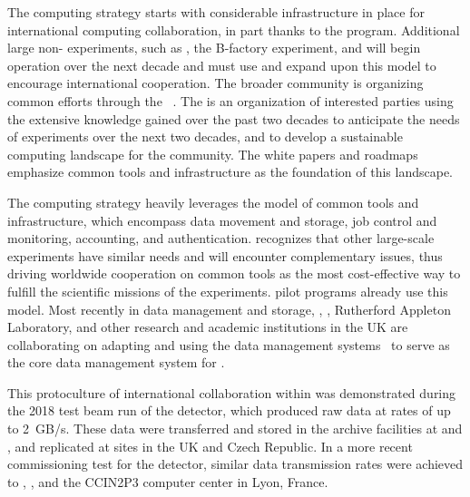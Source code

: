 The  computing strategy starts with considerable infrastructure in place for international computing collaboration, in part thanks to the  program.  Additional large non- experiments,  such as , the  B-factory experiment, and   will begin operation over the next decade and must use and expand upon this model to encourage international cooperation.  The broader  community is organizing common efforts through the ~\cite{Alves:2017she}.  The  is an organization of interested parties using the extensive knowledge gained over the past two decades to anticipate the needs of experiments over the next two decades, and to develop a sustainable computing landscape for the  community.  The  white papers and roadmaps emphasize common tools and infrastructure as the foundation of this landscape.

The  computing strategy heavily leverages the  model of common tools and infrastructure, which encompass data movement and storage, job control and monitoring, accounting, and authentication.  %
 recognizes that other large-scale experiments have similar needs and will encounter complementary issues, thus driving worldwide cooperation on common tools as the most cost-effective way to fulfill the scientific missions of the experiments.   pilot programs already use this model.  Most recently in data management and storage, , , Rutherford Appleton Laboratory, and other research and academic institutions in the %
UK are collaborating on adapting and using the  data management systems~\cite{Barisits:2019fyl}  to serve as the core data management system for .

This protoculture of international collaboration within  %
was demonstrated during the 2018 test beam run of the  detector, which  %
produced raw data at rates of up to \SI{2}{GB/s}.  These data were transferred and stored in the archive facilities at  and , and replicated at sites in the UK and Czech Republic.  In a more recent commissioning test for the  detector, similar data transmission rates %
were achieved to , , and the CCIN2P3 computer center in Lyon, France.

